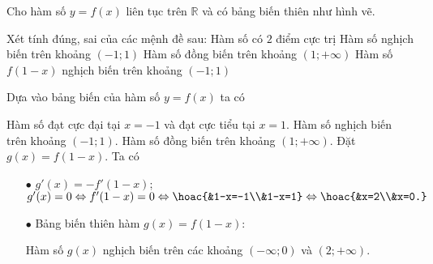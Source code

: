 \begin{ex}%
 Cho hàm số $y=f(x)$ liên tục trên $\mathbb{R}$ và có bảng biến thiên như hình vẽ.
 \begin{center}
 \end{center}
 Xét tính đúng, sai của các mệnh đề sau:
 \choiceTF
 {\True Hàm số có $2$ điểm cực trị}
 {\True Hàm số nghịch biến trên khoảng $(-1;1)$}
 {\True Hàm số đồng biến trên khoảng $(1;+\infty)$}
 {Hàm số $f(1-x)$ nghịch biến trên khoảng $(-1;1)$}
 \loigiai
 {Dựa vào bảng biến của hàm số $y=f(x)$ ta có
 \begin{itemchoice}
 \itemch Hàm số đạt cực đại tại $x=-1$ và đạt cực tiểu tại $x=1$.
 \itemch Hàm số nghịch biến trên khoảng $(-1;1)$.
 \itemch Hàm số đồng biến trên khoảng $(1;+\infty)$.
 \itemch Đặt $g(x)=f(1-x)$. Ta có
 \begin{itemize}
 \item [$\bullet$] $g'(x)=-f'(1-x)$; \\
 $g'(x)=0 \Leftrightarrow f'(1-x)=0 \Leftrightarrow \hoac{&1-x=-1\\&1-x=1}\Leftrightarrow \hoac{&x=2\\&x=0.}$
 \item [$\bullet$] Bảng biến thiên hàm $g(x)=f(1-x)$:
 \begin{center}
 \end{center}
 Hàm số $g(x)$ nghịch biến trên các khoảng $(-\infty;0)$ và $(2;+\infty)$.
 \end{itemize}
 \end{itemchoice}
 }
\end{ex}
